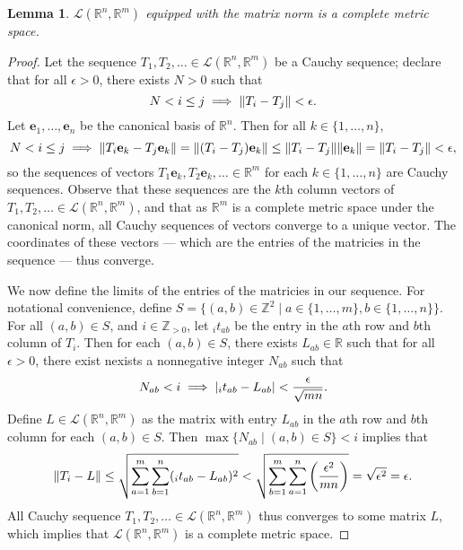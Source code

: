 \documentclass[11pt]{article}
\newtheorem*{lemma*}{Lemma}
\renewcommand{\vec}[1]{\mathbf{#1}}
\begin{document}
\begin{adjustwidth}{1cm}{}
	\begin{lemma*}
		$\mathcal{L}(\mathbb{R}^{n}, \mathbb{R}^{m})$ equipped with the matrix norm is a complete metric space.
	\end{lemma*}
    \begin{proof}\renewcommand{\qedsymbol}{}
		Let the sequence $T_{1}, T_{2}, \ldots \in \mathcal{L}(\mathbb{R}^{n}, \mathbb{R}^{m})$ be a Cauchy sequence; declare that for all $\epsilon > 0$, there exists $N > 0$ such that
		\[
			N < i \le j \implies \norm{T_{i} - T_{j}} < \epsilon.
		\]
		Let $\vec{e}_{1}, \ldots, \vec{e}_{n}$ be the canonical basis of $\mathbb{R}^{n}$. Then for all $k \in \{ 1, \ldots, n \}$,
		\[
			N < i \le j \implies \norm{T_{i} \vec{e}_{k} - T_{j} \vec{e}_{k}} = \norm{(T_{i} - T_{j})\vec{e}_{k}} \le \norm{T_{i} - T_{j}} \norm{\vec{e}_{k}} = \norm{T_{i} - T_{j}} < \epsilon,
		\]
		so the sequences of vectors $T_{1} \vec{e}_{k}, T_{2} \vec{e}_{k}, \ldots \in \mathbb{R}^{m}$ for each $k \in \{ 1, \ldots, n \}$ are Cauchy sequences. Observe that these sequences are the $k$th column vectors of $T_{1}, T_{2}, \ldots \in \mathcal{L}(\mathbb{R}^{n}, \mathbb{R}^{m})$, and that as $\mathbb{R}^{m}$ is a complete metric space under the canonical norm, all Cauchy sequences of vectors converge to a unique vector. The coordinates of these vectors --- which are the entries of the matricies in the sequence --- thus converge.

		We now define the limits of the entries of the matricies in our sequence. For notational convenience, define $S = \{ (a, b) \in \mathbb{Z}^{2} \mid a \in \{ 1, \ldots, m \}, b \in \{ 1, \ldots, n \} \}$. For all $(a, b) \in S$, and $i \in \mathbb{Z}_{> 0}$, let $_{i} t_{ab}$ be the entry in the $a$th row and $b$th column of $T_{i}$. Then for each $(a, b) \in S$, there exists $L_{ab} \in \mathbb{R}$ such that for all $\epsilon > 0$, there exist nexists a nonnegative integer $N_{ab}$ such that
		\[
			N_{ab} < i \implies \abs{_{i} t_{ab} - L_{ab}} < \frac{\epsilon}{\sqrt{mn}}.
		\]
		Define $L \in \mathcal{L}(\mathbb{R}^{n}, \mathbb{R}^{m})$ as the matrix with entry $L_{ab}$ in the $a$th row and $b$th column for each $(a, b) \in S$. Then $\max \{ N_{ab} \mid (a, b) \in S\} < i$ implies that
		\[
			\norm{T_{i} - L} \le \sqrt{\sum_{a = 1}^{m} \sum_{b = 1}^{n} (_i t_{ab} - L_{ab})^{2}} < \sqrt{\sum_{b = 1}^{m} \sum_{a = 1}^{n}\left( \frac{\epsilon^{2}}{mn} \right)} = \sqrt{\epsilon^{2}} = \epsilon.
		\]
		All Cauchy sequence $T_{1}, T_{2}, \ldots \in \mathcal{L}(\mathbb{R}^{n}, \mathbb{R}^{m})$ thus converges to some matrix $L$, which implies that $\mathcal{L}(\mathbb{R}^{n}, \mathbb{R}^{m})$ is a complete metric space.	
	\end{proof}
\end{adjustwidth}
\end{document}
